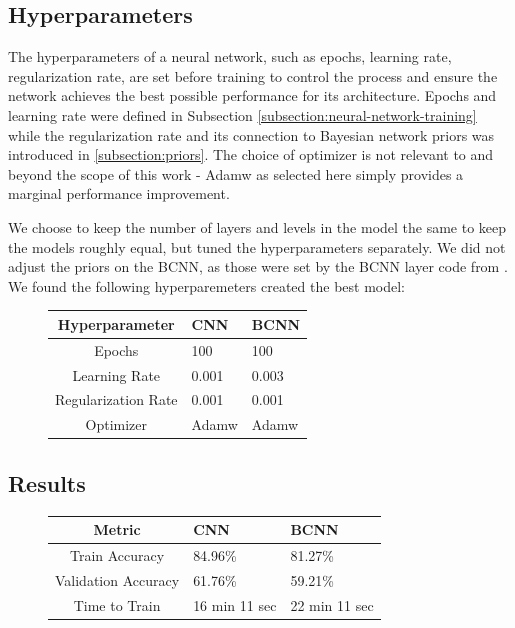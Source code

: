 \documentclass[12pt]{article}
\begin{document}
\subsection{Hyperparameters}

The hyperparameters of a neural network, such as epochs, learning rate, regularization rate, are set before training to control the process and ensure the network achieves the best possible performance for its architecture. Epochs and learning rate were defined in Subsection \ref{subsection:neural-network-training} while the regularization rate and its connection to Bayesian network priors was introduced in \ref{subsection:priors}. The choice of optimizer is not relevant to and beyond the scope of this work - Adamw as selected here simply provides a marginal performance improvement. 

We choose to keep the number of layers and levels in the model the same to keep the models roughly equal, but tuned the hyperparameters separately. We did not adjust the priors on the BCNN, as those were set by the BCNN layer code from \cite{shridhar2018uncertainty}. We found the following hyperparemeters created the best model:

\begin{figure}[H]
	\begin{center}
	\begin{tabular}{|c||p{3cm}|p{3cm}|} %
	\hline
	\textbf{Hyperparameter} & \textbf{CNN} & \textbf{BCNN} \\ [0.5ex] 
	\hline\hline
	Epochs & 100 & 100\\
	\hline
	Learning Rate & 0.001  & 0.003  \\
	\hline
	Regularization Rate& 0.001 & 0.001 \\
	\hline
	Optimizer & Adamw  & Adamw  \\
	\hline
\end{tabular}
\end{center}
\end{figure}



\subsection{Results}

\begin{figure}[H]
	\centering
	\begin{tabular}{|c||p{3cm}|p{3cm}|} %
		\hline
		\textbf{Metric} & \textbf{CNN} & \textbf{BCNN} \\ [0.5ex] 
		\hline\hline
		Train Accuracy & 84.96\% & 81.27\%\\
		\hline
		Validation Accuracy & 61.76\%  & 59.21\%  \\
		\hline
		Time to Train & 16 min 11 sec  & 22 min 11 sec  \\
		\hline
	\end{tabular}
\end{figure}
\end{document}
